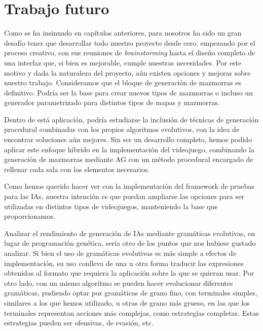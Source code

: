 \section{Trabajo futuro}
Como se ha insinuado en cap\'itulos anteriores, para nosotros ha sido un gran desaf\'io tener que desarrollar todo nuestro proyecto desde cero, empezando por el proceso creativo, con sus reuniones de \textit{brainstorming} hasta el dise\~no completo de una interfaz que, si bien es mejorable, cumple nuestras necesidades. Por este motivo y dada la naturaleza del proyecto, a\'un existen opciones y mejoras sobre nuestro trabajo. Consideramos que el bloque de generaci\'on de mazmorras es definitivo. Podr\'ia ser la base para crear nuevos tipos de mazmorras o incluso un generador parametrizado para distintos tipos de mapas y mazmorras.\par
Dentro de est\'a aplicaci\'on, podr\'ia estudiarse la inclusi\'on de t\'ecnicas de generaci\'on procedural combinadas con los propios algoritmos evolutivos, con la idea de encontrar soluciones a\'un mejores. Sin ser un desarrollo completo, hemos podido aplicar este enfoque h\'ibrido en la implementaci\'on del videojuego, combinando la generaci\'on de mazmorras mediante AG con un m\'etodo procedural encargado de rellenar cada sala con los elementos necesarios.\par
Como hemos querido hacer ver con la implementaci\'on del framework de pruebas para las IAs, nuestra intenci\'on es que puedan ampliarse las opciones para ser utilizadas en distintos tipos de videojuegos, manteniendo la base que proporcionamos.\par
Analizar el rendimiento de generaci\'on de IAs mediante gram\'aticas evolutivas, en lugar de programaci\'on gen\'etica, ser\'ia otro de los puntos que nos hubiese gustado analizar. Si bien el uso de gram\'aticas evolutivas es m\'as simple a efectos de implementaci\'on, su uso conlleva de una u otra forma traducir las expresiones obtenidas al formato que requiera la aplicaci\'on sobre la que se quieran usar. Por otro lado, con un mismo algoritmo se pueden hacer evolucionar diferentes gram\'aticas, pudiendo optar por gram\'aticas de grano fino, con terminales simples, similares a los que hemos utilizado, u otras de grano m\'as grueso, en las que los terminales representan acciones m\'as complejas, como estrategias completas. Estas estrategias pueden ser ofensivas, de evasi\'on, etc.\par

